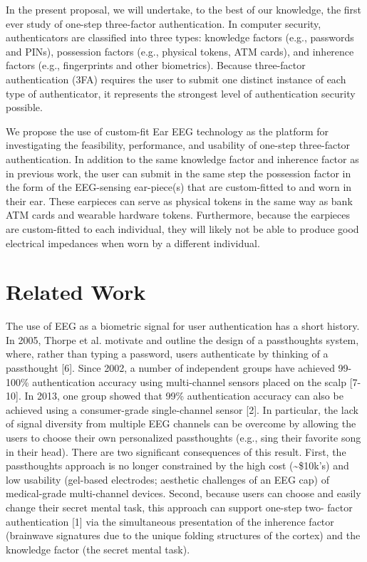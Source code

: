 \documentclass[11pt]{article}
\begin{document}
In the present proposal, we will undertake, to the best of our knowledge, the first
ever study of one-step three-factor authentication. In computer security,
authenticators are classified into three types: knowledge factors (e.g., passwords
and PINs), possession factors (e.g., physical tokens, ATM cards), and inherence
factors (e.g., fingerprints and other biometrics). Because three-factor
authentication (3FA) requires the user to submit one distinct instance of each
type of authenticator, it represents the strongest level of authentication security
possible.

We propose the use of custom-fit Ear EEG technology as the platform for
investigating the feasibility, performance, and usability of one-step three-factor
authentication. In addition to the same knowledge factor and inherence factor as
in previous work, the user can submit in the same step the possession factor
in the form of the EEG-sensing ear-piece(s) that are custom-fitted to and worn in
their ear. These earpieces can serve as physical tokens in the same way as bank
ATM cards and wearable hardware tokens. Furthermore, because the earpieces
are custom-fitted to each individual, they will likely not be able to produce good
electrical impedances when worn by a different individual.

\section{Related Work}
\label{sec:org9b2bd46}
The use of EEG as a biometric signal for user authentication has a short history.
In 2005, Thorpe et al. motivate and outline the design of a passthoughts system,
where, rather than typing a password, users authenticate 
by thinking of a passthought [6]. Since 2002, a number of independent groups have achieved 99-
100\% authentication accuracy using multi-channel sensors placed on the scalp
[7-10]. In 2013, one group showed that 99\% authentication accuracy can also be
achieved using a consumer-grade single-channel sensor [2]. In particular, the
lack of signal diversity from multiple EEG channels can be overcome by allowing
the users to choose their own personalized passthoughts (e.g., sing their favorite
song in their head). There are two significant consequences of this result. First,
the passthoughts approach is no longer constrained by the high cost (\textasciitilde{}\$10k’s)
and low usability (gel-based electrodes; aesthetic challenges of an EEG cap) of
medical-grade multi-channel devices. Second, because users can choose and
easily change their secret mental task, this approach can support one-step two-
factor authentication [1] via the simultaneous presentation of the inherence factor
(brainwave signatures due to the unique folding structures of the cortex) and the
knowledge factor (the secret mental task).
\end{document}
